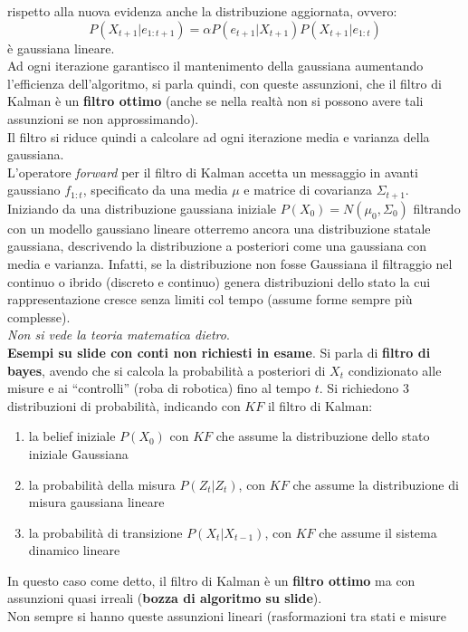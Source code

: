\documentclass[a4paper,12pt, oneside]{book}
\begin{document}
rispetto alla nuova evidenza anche la distribuzione aggiornata, ovvero:
\[P(X_{t+1}|e_{1:t+1})=\alpha P(e_{t+1}|X_{t+1})P(X_{t+1}|e_{1:t})\]
è gaussiana lineare.\\
Ad ogni iterazione garantisco il mantenimento della gaussiana aumentando
l'efficienza dell'algoritmo, si parla quindi, con queste assunzioni, che il
filtro di Kalman è un \textbf{filtro ottimo} (anche se nella realtà non si
possono avere tali assunzioni se non approssimando).\\
Il filtro si riduce quindi a calcolare ad ogni iterazione media e varianza
della gaussiana.\\
L'operatore \textit{forward} per il filtro di Kalman accetta un messaggio in
avanti gaussiano $f_{1:t}$, specificato da una media $\mu$ e matrice di
covarianza $\Sigma_{t+1}$. Iniziando da una distribuzione gaussiana iniziale
$P(X_0)=N(\mu_0,\Sigma_0)$ filtrando con un modello gaussiano lineare otterremo
ancora una distribuzione statale gaussiana, descrivendo la distribuzione a
posteriori come una gaussiana con media e varianza. Infatti, se la distribuzione
non fosse Gaussiana il filtraggio nel continuo o ibrido (discreto e continuo)
genera distribuzioni dello stato la cui rappresentazione cresce senza limiti col
tempo (assume forme sempre più complesse). \\
\textit{Non si vede la teoria matematica dietro}.\\
\textbf{Esempi su slide con conti non richiesti in esame}.
Si parla di \textbf{filtro di bayes}, avendo che si calcola la probabilità a
posteriori di $X_t$ condizionato alle 
misure e ai ``controlli'' (roba di robotica) fino al tempo $t$. Si richiedono 3
distribuzioni di probabilità, indicando con $KF$ il filtro di Kalman:
\begin{enumerate}
  \item la belief iniziale $P(X_0)$ con $KF$ che assume la distribuzione dello
  stato iniziale Gaussiana 
  \item la probabilità della misura $P(Z_t|Z_t)$, con $KF$ che assume la
  distribuzione di misura gaussiana lineare 
  \item la probabilità di transizione $P(X_t|X_{t-1})$, con $KF$ che assume il
  sistema dinamico lineare 
\end{enumerate}
In questo caso come detto, il filtro di Kalman è un \textbf{filtro ottimo} ma
con assunzioni quasi irreali (\textbf{bozza di algoritmo su slide}).\\
Non sempre si hanno queste assunzioni lineari (rasformazioni tra stati e misure
\end{document}
